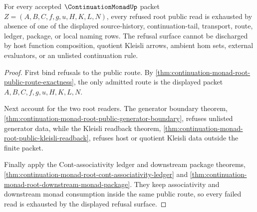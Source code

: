 \begin{theorem}
\label{thm:continuation-monad-root-refusal-exhaustion}
For every accepted $\ContinuationMonadUp$ packet
$Z=(A,B,C,f,g,u,H,K,L,N)$, every refused root public read is exhausted by absence
of one of the displayed source-history, continuation-tail, transport, route,
ledger, package, or local naming rows. The refusal surface cannot be discharged
by host function composition, quotient Kleisli arrows, ambient hom sets,
external evaluators, or an unlisted continuation rule.
\end{theorem}
\begin{proof}
First bind refusals to the public route. By
\autoref{thm:continuation-monad-root-public-route-exactness}, the only admitted
route is the displayed packet $A,B,C,f,g,u,H,K,L,N$.

Next account for the two root readers. The generator boundary theorem,
\autoref{thm:continuation-monad-root-public-generator-boundary}, refuses
unlisted generator data, while the Kleisli readback theorem,
\autoref{thm:continuation-monad-root-public-kleisli-readback}, refuses host or
quotient Kleisli data outside the finite packet.

Finally apply the Cont-associativity ledger and downstream package theorems,
\autoref{thm:continuation-monad-root-cont-associativity-ledger} and
\autoref{thm:continuation-monad-root-downstream-monad-package}. They keep
associativity and downstream monad consumption inside the same public route, so
every failed read is exhausted by the displayed refusal surface.
\end{proof}

